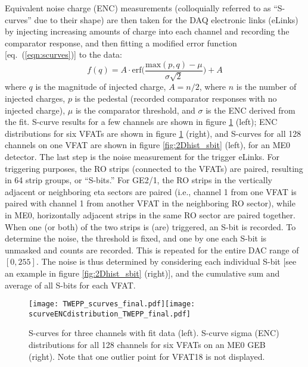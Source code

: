 \documentclass[a4paper,11pt]{article}
\begin{document}
Equivalent noise charge (ENC) measurements (colloquially referred to as ``S-curves'' due to their shape) are then taken for the DAQ electronic links (eLinks) by injecting increasing amounts of charge into each channel and recording the comparator response, and then fitting a modified error function [eq.~(\ref{eqn:scurves})] to the data:
\begin{equation}\label{eqn:scurves}\tag{1}
f(q) =A\cdot\mathrm{erf}\bigg(\dfrac{\mathrm{max}(p,q) - \mu}{\sigma\sqrt{2}}\bigg) + A
\end{equation}
where $q$ is the magnitude of injected charge, $A=n/2$, where $n$ is the number of injected charges, $p$ is the pedestal (recorded comparator responses with no injected charge), $\mu$ is the comparator threshold, and $\sigma$ is the ENC derived from the fit. S-curve results for a few channels are shown in figure \ref{fig:ENCandDist} (left); ENC distributions for six VFATs are shown in figure \ref{fig:ENCandDist} (right), and S-curves for all 128 channels on one VFAT are shown in figure \ref{fig:2Dhist_sbit} (left), for an ME0 detector. 
The last step is the noise measurement for the trigger eLinks. For triggering purposes, the RO strips (connected to the VFATs) are paired, resulting in 64 strip groups, or ``S-bits.'' For GE2/1, the RO strips in the vertically adjacent or neighboring eta sectors are paired (i.e., channel 1 from one VFAT is paired with channel 1 from another VFAT in the neighboring RO sector), while in ME0, horizontally adjacent strips in the same RO sector are paired together. When one (or both) of the two strips is (are) triggered, an S-bit is recorded. To determine the noise, the threshold is fixed, and one by one each S-bit is unmasked and counts are recorded. This is repeated for the entire DAC range of $[0,255]$. The noise is thus determined by considering each individual S-bit [see an example in figure \ref{fig:2Dhist_sbit} (right)], and the cumulative sum and average of all S-bits for each VFAT.
\begin{figure}[!htp]
\centering
\texttt{[image: TWEPP\_scurves\_final.pdf]}\hspace{0.2cm}\texttt{[image: scurveENCdistribution\_TWEPP\_final.pdf]}
\caption{\label{fig:ENCandDist}S-curves for three channels with fit data (left). S-curve sigma (ENC) distributions for all 128 channels for six VFATs on an ME0 GEB (right). Note that one outlier point for VFAT18 is not displayed.}
\end{figure}
\end{document}
